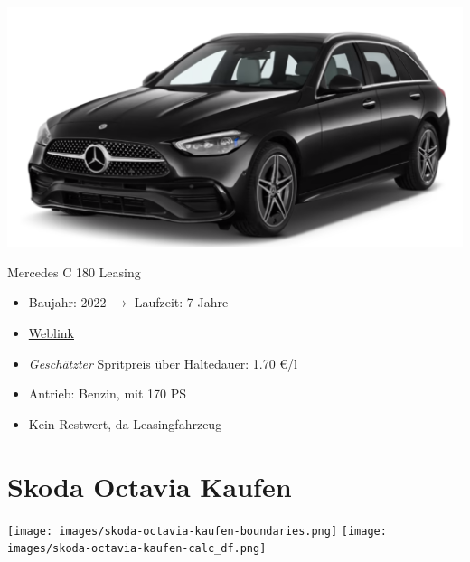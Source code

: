 \documentclass[landscape, DIV=99, 14pt]{scrartcl}
\begin{document}
\pagebreak
\null
\vspace{2cm}
\begin{center}
\includegraphics[width=0.9\columnwidth]{cars/mercedes-c-180-t.png}

Mercedes C 180 Leasing
\end{center}

\begin{itemize}
    \item Baujahr: 2022 $\rightarrow$ Laufzeit: 7 Jahre
    \item \href{https://konfigurator.meinauto.de/mercedes/neuwagen/c-klasse/angebote/c-klasse-t-modell/konfigurator/\#!/preisvergleich/-/8866563/2,47,74,81/private/43735-7309-290394/349/61d36ce4c3067/cash-purchase/73169--190162/48,0,10000,0,0,0,0,0,}{Weblink}
    \item \emph{Gesch\"atzter} Spritpreis \"uber Haltedauer: 1.70 \euro{}/l
    \item Antrieb: Benzin, mit 170 PS
    \item Kein Restwert, da Leasingfahrzeug
\end{itemize}

\pagebreak


\twocolumn

\section*{Skoda Octavia Kaufen}
\begin{center}
\texttt{[image: images/skoda-octavia-kaufen-boundaries.png]}
\null
\vspace{0.5cm}
\texttt{[image: images/skoda-octavia-kaufen-calc\_df.png]}
\end{center}
\end{document}
